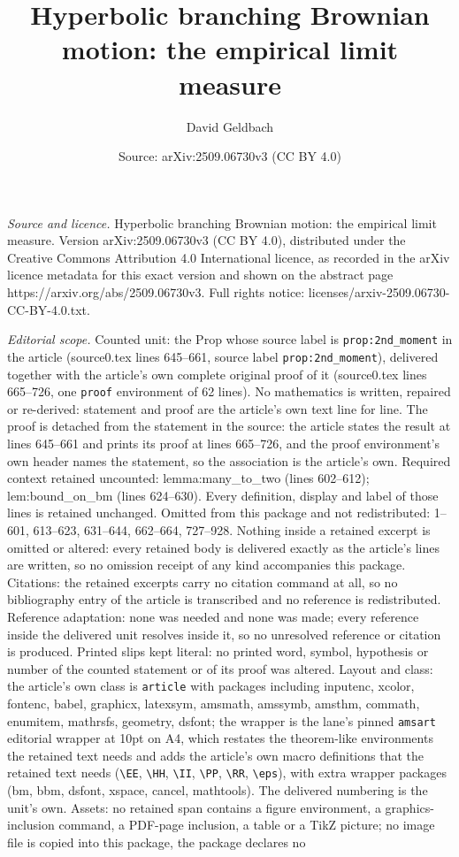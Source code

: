 \documentclass[10pt,a4paper]{amsart}
\title[Hyperbolic branching Brownian motion: the empirical limit me]{Hyperbolic branching Brownian motion: the empirical limit measure}
\author{David Geldbach}
\date{Source: arXiv:2509.06730v3 (CC BY 4.0)}
\begin{document}
\maketitle

\noindent\emph{Source and licence.} Hyperbolic branching Brownian motion: the empirical limit measure. Version arXiv:2509.06730v3 (CC BY 4.0), distributed under the Creative Commons Attribution 4.0 International licence, as recorded in the arXiv licence metadata for this exact version and shown on the abstract page https://arxiv.org/abs/2509.06730v3. Full rights notice: licenses/arxiv-2509.06730-CC-BY-4.0.txt.\par\smallskip

\noindent\textit{Editorial scope.} Counted unit: the Prop whose source label is \texttt{prop:2nd\_moment} in the article (source0.tex lines 645--661, source label \texttt{prop:2nd\_moment}), delivered together with the article's own complete original proof of it (source0.tex lines 665--726, one \texttt{proof} environment of 62 lines). No mathematics is written, repaired or re-derived: statement and proof are the article's own text line for line. The proof is detached from the statement in the source: the article states the result at lines 645--661 and prints its proof at lines 665--726, and the proof environment's own header names the statement, so the association is the article's own. Required context retained uncounted: lemma:many\_to\_two (lines 602--612); lem:bound\_on\_bm (lines 624--630). Every definition, display and label of those lines is retained unchanged. Omitted from this package and not redistributed: 1--601, 613--623, 631--644, 662--664, 727--928. Nothing inside a retained excerpt is omitted or altered: every retained body is delivered exactly as the article's lines are written, so no omission receipt of any kind accompanies this package. Citations: the retained excerpts carry no citation command at all, so no bibliography entry of the article is transcribed and no reference is redistributed. Reference adaptation: none was needed and none was made; every reference inside the delivered unit resolves inside it, so no unresolved reference or citation is produced. Printed slips kept literal: no printed word, symbol, hypothesis or number of the counted statement or of its proof was altered. Layout and class: the article's own class is \texttt{article} with packages including inputenc, xcolor, fontenc, babel, graphicx, latexsym, amsmath, amssymb, amsthm, commath, enumitem, mathrsfs, geometry, dsfont; the wrapper is the lane's pinned \texttt{amsart} editorial wrapper at 10pt on A4, which restates the theorem-like environments the retained text needs and adds the article's own macro definitions that the retained text needs (\texttt{\textbackslash EE}, \texttt{\textbackslash HH}, \texttt{\textbackslash II}, \texttt{\textbackslash PP}, \texttt{\textbackslash RR}, \texttt{\textbackslash eps}), with extra wrapper packages (bm, bbm, dsfont, xspace, cancel, mathtools). The delivered numbering is the unit's own. Assets: no retained span contains a figure environment, a graphics-inclusion command, a PDF-page inclusion, a table or a TikZ picture; no image file is copied into this package, the package declares no 
\end{document}
